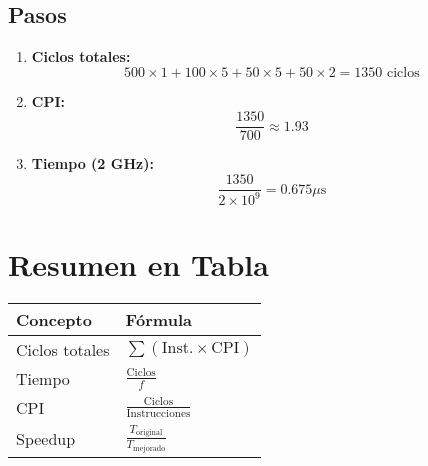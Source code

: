 \documentclass[12pt, a4paper]{article}
\begin{document}
\subsection{Pasos}
\begin{enumerate}
    \item \textbf{Ciclos totales:} 
    \[
    500 \times 1 + 100 \times 5 + 50 \times 5 + 50 \times 2 = 1350 \text{ ciclos}
    \]
    \item \textbf{CPI:} 
    \[
    \frac{1350}{700} \approx 1.93
    \]
    \item \textbf{Tiempo (2 GHz):} 
    \[
    \frac{1350}{2 \times 10^9} = 0.675 \mu\text{s}
    \]
\end{enumerate}

\section{Resumen en Tabla}
\begin{tabular}{ll}
    \toprule
    \textbf{Concepto} & \textbf{Fórmula} \\
    \midrule
    Ciclos totales & \(\sum (\text{Inst.} \times \text{CPI})\) \\
    Tiempo & \(\frac{\text{Ciclos}}{f}\) \\
    CPI & \(\frac{\text{Ciclos}}{\text{Instrucciones}}\) \\
    Speedup & \(\frac{T_{\text{original}}}{T_{\text{mejorado}}}\) \\
    \bottomrule
\end{tabular}
\end{document}
